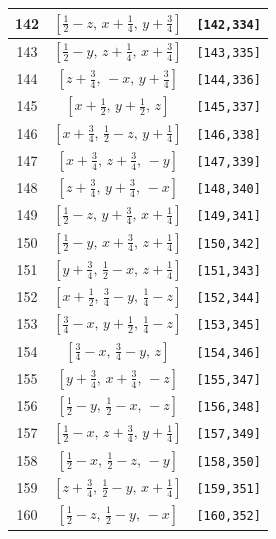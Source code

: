 \documentclass[fleqn,8pt]{jsarticle}
\begin{document}
\begin{longtable}{ccc}
142 & $\left[ \frac{1}{2} - z,\, x + \frac{1}{4},\, y + \frac{3}{4} \right]$ & {\tt [142,334]} \\ \hline
143 & $\left[ \frac{1}{2} - y,\, z + \frac{1}{4},\, x + \frac{3}{4} \right]$ & {\tt [143,335]} \\ \hline
144 & $\left[ z + \frac{3}{4},\, - x,\, y + \frac{3}{4} \right]$ & {\tt [144,336]} \\ \hline
145 & $\left[ x + \frac{1}{2},\, y + \frac{1}{2},\, z \right]$ & {\tt [145,337]} \\ \hline
146 & $\left[ x + \frac{3}{4},\, \frac{1}{2} - z,\, y + \frac{1}{4} \right]$ & {\tt [146,338]} \\ \hline
147 & $\left[ x + \frac{3}{4},\, z + \frac{3}{4},\, - y \right]$ & {\tt [147,339]} \\ \hline
148 & $\left[ z + \frac{3}{4},\, y + \frac{3}{4},\, - x \right]$ & {\tt [148,340]} \\ \hline
149 & $\left[ \frac{1}{2} - z,\, y + \frac{3}{4},\, x + \frac{1}{4} \right]$ & {\tt [149,341]} \\ \hline
150 & $\left[ \frac{1}{2} - y,\, x + \frac{3}{4},\, z + \frac{1}{4} \right]$ & {\tt [150,342]} \\ \hline
151 & $\left[ y + \frac{3}{4},\, \frac{1}{2} - x,\, z + \frac{1}{4} \right]$ & {\tt [151,343]} \\ \hline
152 & $\left[ x + \frac{1}{2},\, \frac{3}{4} - y,\, \frac{1}{4} - z \right]$ & {\tt [152,344]} \\ \hline
153 & $\left[ \frac{3}{4} - x,\, y + \frac{1}{2},\, \frac{1}{4} - z \right]$ & {\tt [153,345]} \\ \hline
154 & $\left[ \frac{3}{4} - x,\, \frac{3}{4} - y,\, z \right]$ & {\tt [154,346]} \\ \hline
155 & $\left[ y + \frac{3}{4},\, x + \frac{3}{4},\, - z \right]$ & {\tt [155,347]} \\ \hline
156 & $\left[ \frac{1}{2} - y,\, \frac{1}{2} - x,\, - z \right]$ & {\tt [156,348]} \\ \hline
157 & $\left[ \frac{1}{2} - x,\, z + \frac{3}{4},\, y + \frac{1}{4} \right]$ & {\tt [157,349]} \\ \hline
158 & $\left[ \frac{1}{2} - x,\, \frac{1}{2} - z,\, - y \right]$ & {\tt [158,350]} \\ \hline
159 & $\left[ z + \frac{3}{4},\, \frac{1}{2} - y,\, x + \frac{1}{4} \right]$ & {\tt [159,351]} \\ \hline
160 & $\left[ \frac{1}{2} - z,\, \frac{1}{2} - y,\, - x \right]$ & {\tt [160,352]} \\ \hline

\end{longtable}
\end{document}
